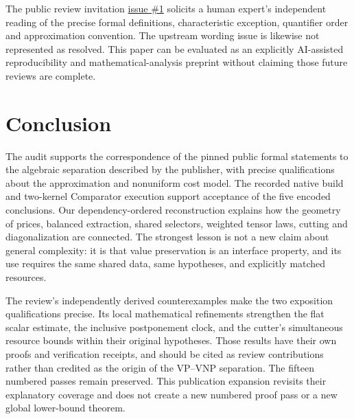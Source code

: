 \documentclass[11pt,letterpaper]{article}
\theoremstyle{definition}\newtheorem{definition}[theorem]{Definition}\newtheorem{example}[theorem]{Example}
\theoremstyle{remark}\newtheorem{remark}[theorem]{Remark}
\begin{document}
The public review invitation \href{https://github.com/nousentllc/VP-VNP-Review/issues/1}{issue \#1} solicits a human expert's independent reading of the precise formal definitions, characteristic exception, quantifier order and approximation convention. The upstream wording issue is likewise not represented as resolved. This paper can be evaluated as an explicitly AI-assisted reproducibility and mathematical-analysis preprint without claiming those future reviews are complete.

\section{Conclusion}\label{sec:conclusion}
The audit supports the correspondence of the pinned public formal statements to the algebraic separation described by the publisher, with precise qualifications about the approximation and nonuniform cost model. The recorded native build and two-kernel Comparator execution support acceptance of the five encoded conclusions. Our dependency-ordered reconstruction explains how the geometry of prices, balanced extraction, shared selectors, weighted tensor laws, cutting and diagonalization are connected. The strongest lesson is not a new claim about general complexity: it is that value preservation is an interface property, and its use requires the same shared data, same hypotheses, and explicitly matched resources.

The review's independently derived counterexamples make the two exposition qualifications precise. Its local mathematical refinements strengthen the flat scalar estimate, the inclusive postponement clock, and the cutter's simultaneous resource bounds within their original hypotheses. Those results have their own proofs and verification receipts, and should be cited as review contributions rather than credited as the origin of the VP--VNP separation. The fifteen numbered passes remain preserved. This publication expansion revisits their explanatory coverage and does not create a new numbered proof pass or a new global lower-bound theorem.
\end{document}
